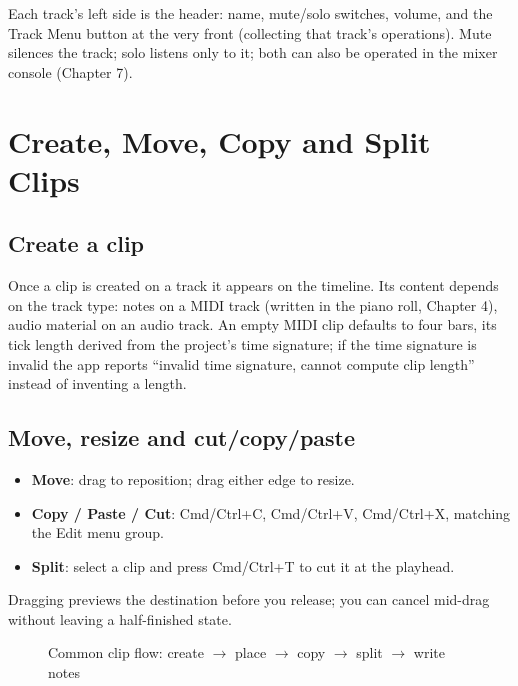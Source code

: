 Each track's left side is the header: name, mute/solo switches, volume, and the Track
Menu button at the very front (collecting that track's operations). Mute silences the
track; solo listens only to it; both can also be operated in the mixer console
(Chapter 7).


\section{Create, Move, Copy and Split Clips}

\subsection{Create a clip}

Once a clip is created on a track it appears on the timeline. Its content depends on
the track type: notes on a MIDI track (written in the piano roll, Chapter 4), audio
material on an audio track. An empty MIDI clip defaults to four bars, its tick length
derived from the project's time signature; if the time signature is invalid the app
reports ``invalid time signature, cannot compute clip length'' instead of inventing
a length.

\subsection{Move, resize and cut/copy/paste}

\begin{itemize}
  \item \textbf{Move}: drag to reposition; drag either edge to resize.
  \item \textbf{Copy / Paste / Cut}: Cmd/Ctrl+C, Cmd/Ctrl+V, Cmd/Ctrl+X, matching the Edit menu group.
  \item \textbf{Split}: select a clip and press Cmd/Ctrl+T to cut it at the playhead.
\end{itemize}

Dragging previews the destination before you release; you can cancel mid-drag without
leaving a half-finished state.

\begin{figure}[htbp]
\centering
{}
\caption{Common clip flow: create $\to$ place $\to$ copy $\to$ split $\to$ write notes}
\label{fig:ch03-clip-flow}
\end{figure}


